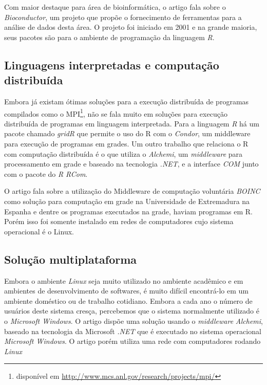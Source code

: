 Com maior destaque para área de bioinformática, o artigo 
\cite{bioconductor} fala sobre o \emph{Bioconductor}, um projeto  que propõe o fornecimento 
de ferramentas para a análise de dados desta área. O projeto foi iniciado em 2001 e na grande maioria, 
seus pacotes são para o ambiente de programação da linguagem \emph{R}.

\subsection{Linguagens interpretadas e computação distribuída}

Embora já existam ótimas soluções para a execução distribuída de programas compilados como o
 MPI\footnote{disponível em \url{http://www.mcs.anl.gov/research/projects/mpi/}}, não se fala muito em soluções 
para execução distribuída de programas em linguagem interpretada. 
Para a linguagem \emph{R} há um pacote chamado \emph{gridR} que permite o uso do R com o \emph{Condor}, %
um middleware para execução de programas em grades.  
Um outro trabalho que relaciona o R com computação distribuída é o \cite{Dias} que 
utiliza o \emph{Alchemi}, um \textit{middleware} para processamento em grade e baseado na 
tecnologia \textit{.NET}, e a interface \textit{COM} junto com o pacote do \emph{R}
\emph{RCom}.  


O artigo \cite{boinc} fala sobre a utilização do Middleware de computação voluntária \emph{BOINC} como solução para computação 
em grade na Universidade de Extremadura na Espanha e dentre os programas executados na grade, haviam
programas em R. Porém isso foi somente instalado em redes de computadores cujo sistema
operacional é o Linux. 


\subsection{Solução multiplataforma}

Embora o ambiente \emph{Linux} seja muito utilizado no ambiente acadêmico e em ambientes de desenvolvimento de softwares, é
muito difícil encontrá-lo em um ambiente doméstico ou de trabalho cotidiano. Embora a cada ano o número de usuários deste 
sistema cresça, percebemos que o sistema normalmente utilizado é o \emph{Microsoft Windows}. O artigo \cite{Dias}
dispõe uma solução usando o \emph{middleware} \emph{Alchemi}, baseado na tecnologia da Microsoft \emph{.NET} que é executado
no sistema operacional \emph{Microsoft Windows}. O artigo \cite{boinc} porém utiliza uma rede com computadores rodando \emph{Linux}

